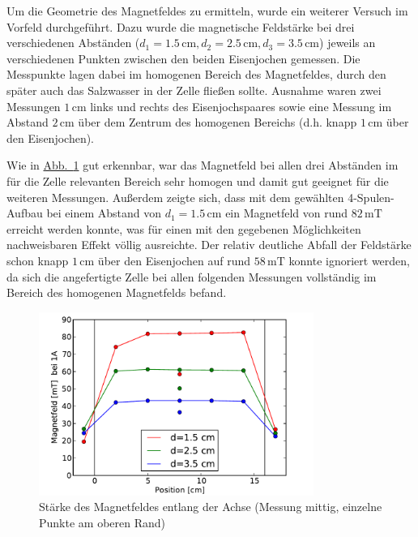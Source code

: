 \documentclass[11pt]{scrartcl}
\newcommand{\unit}[1]{\ensuremath{\,\mathrm{#1}}} %
\begin{document}
Um die Geometrie des Magnetfeldes zu ermitteln, wurde ein weiterer Versuch im Vorfeld durchgeführt. Dazu wurde die magnetische Feldstärke bei drei verschiedenen Abständen ($d_1=1.5 \unit{cm}, d_2=2.5 \unit{cm}, d_3=3.5 \unit{cm}$) jeweils an verschiedenen Punkten zwischen den beiden Eisenjochen gemessen. Die Messpunkte lagen dabei im homogenen Bereich des Magnetfeldes, durch den später auch das Salzwasser in der Zelle fließen sollte. Ausnahme waren zwei Messungen $1 \unit{cm}$ links und rechts des Eisenjochspaares sowie eine Messung im Abstand $2 \unit{cm}$ über dem Zentrum des homogenen Bereichs (d.h. knapp $1 \unit{cm}$ über den Eisenjochen).

Wie in \hyperref[vormessung_magnetfeld]{Abb.~\ref{vormessung_magnetfeld}} gut erkennbar, war das Magnetfeld bei allen drei Abständen im für die Zelle relevanten Bereich sehr homogen und damit gut geeignet für die weiteren Messungen. Außerdem zeigte sich, dass mit dem gewählten 4-Spulen-Aufbau bei einem Abstand von $d_1=1.5 \unit{cm}$ ein Magnetfeld von rund $82 \unit{mT}$ erreicht werden konnte, was für einen mit den gegebenen Möglichkeiten nachweisbaren Effekt völlig ausreichte.
Der relativ deutliche Abfall der Feldstärke schon knapp $1 \unit{cm}$ über den Eisenjochen auf rund $58 \unit{mT}$ konnte ignoriert werden, da sich die angefertigte Zelle bei allen folgenden Messungen vollständig im Bereich des homogenen Magnetfelds befand. 

\begin{figure}[ht]
\begin{center}
\includegraphics[width=0.8\textwidth]{images/vormessung_magnetfeld.pdf}
\end{center}
\vspace{-1.5\baselineskip}
\caption{Stärke des Magnetfeldes entlang der Achse (Messung mittig, einzelne Punkte am oberen Rand)}
\label{vormessung_magnetfeld}
\end{figure}
\end{document}
